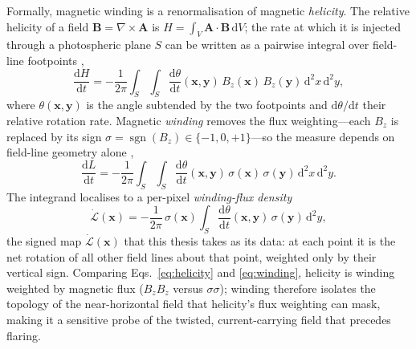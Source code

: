 Formally, magnetic winding is a renormalisation of magnetic \emph{helicity}. The
relative helicity of a field $\mathbf{B}=\nabla\times\mathbf{A}$ is
$H=\int_V \mathbf{A}\cdot\mathbf{B}\,\mathrm{d}V$; the rate at which it is injected
through a photospheric plane $S$ can be written as a pairwise integral over
field-line footpoints \citep{prior2019},
\begin{equation}
  \frac{\mathrm{d}H}{\mathrm{d}t} = -\frac{1}{2\pi}\int_S\!\int_S
    \frac{\mathrm{d}\theta}{\mathrm{d}t}(\mathbf{x},\mathbf{y})\,
    B_z(\mathbf{x})\,B_z(\mathbf{y})\,\mathrm{d}^2x\,\mathrm{d}^2y,
  \label{eq:helicity}
\end{equation}
where $\theta(\mathbf{x},\mathbf{y})$ is the angle subtended by the two footpoints
and $\mathrm{d}\theta/\mathrm{d}t$ their relative rotation rate. Magnetic
\emph{winding} removes the flux weighting---each $B_z$ is replaced by its sign
$\sigma=\operatorname{sgn}(B_z)\in\{-1,0,+1\}$---so the measure depends on
field-line geometry alone \citep{mactaggart2020},
\begin{equation}
  \frac{\mathrm{d}L}{\mathrm{d}t} = -\frac{1}{2\pi}\int_S\!\int_S
    \frac{\mathrm{d}\theta}{\mathrm{d}t}(\mathbf{x},\mathbf{y})\,
    \sigma(\mathbf{x})\,\sigma(\mathbf{y})\,\mathrm{d}^2x\,\mathrm{d}^2y .
  \label{eq:winding}
\end{equation}
The integrand localises to a per-pixel \emph{winding-flux density}
\begin{equation}
  \dot{\mathcal{L}}(\mathbf{x}) = -\frac{1}{2\pi}\,\sigma(\mathbf{x})\!\int_S
    \frac{\mathrm{d}\theta}{\mathrm{d}t}(\mathbf{x},\mathbf{y})\,
    \sigma(\mathbf{y})\,\mathrm{d}^2y ,
  \label{eq:winddens}
\end{equation}
the signed map $\dot{\mathcal{L}}(\mathbf{x})$ that this thesis takes as its data:
at each point it is the net rotation of all other field lines about that point,
weighted only by their vertical sign. Comparing Eqs.~\eqref{eq:helicity} and
\eqref{eq:winding}, helicity is winding weighted by magnetic flux
($B_zB_z$ versus $\sigma\sigma$); winding therefore isolates the topology of the
near-horizontal field that helicity's flux weighting can mask, making it a
sensitive probe of the twisted, current-carrying field that precedes flaring.

